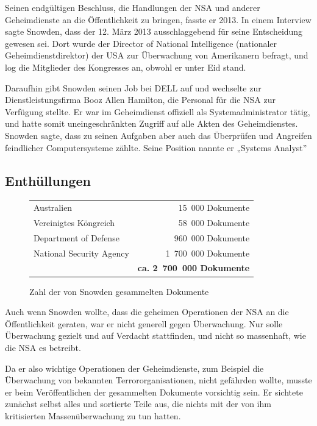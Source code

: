 \documentclass[12pt,a4paper]{scrartcl}
\begin{document}
Seinen endgültigen Beschluss, die Handlungen der NSA und anderer Geheimdienste an die Öffentlichkeit zu bringen, fasste er 2013. In einem Interview sagte Snowden, dass der 12. März 2013 ausschlaggebend für seine Entscheidung gewesen sei. Dort wurde der Director of National Intelligence (nationaler Geheimdienstdirektor) der USA zur Überwachung von Amerikanern befragt, und log die Mitglieder des Kongresses an, obwohl er unter Eid stand.\cite{wiki_snowden}\cite{citizenfour}

Daraufhin gibt Snowden seinen Job bei DELL auf und wechselte zur Dienstleistungsfirma Booz Allen Hamilton, die Personal für die NSA zur Verfügung stellte. Er war im Geheimdienst offiziell als Systemadministrator tätig, und hatte somit uneingeschränkten Zugriff auf alle Akten des Geheimdienstes. Snowden sagte, dass zu seinen Aufgaben aber auch das Überprüfen und Angreifen feindlicher Computersysteme zählte. Seine Position nannte er „Systems Analyst”\cite{citizenfour}

\subsection{Enthüllungen}

\begin{figure}[H]
\centering
\begin{tabular}{lr}
Australien & 15~000 Dokumente \\
Vereinigtes Köngreich & 58~000 Dokumente \\
Department of Defense & 960~000 Dokumente \\
National Security Agency & 1~700~000 Dokumente \\
& \textbf{ca. 2~700~000 Dokumente}
\end{tabular}
\caption{Zahl der von Snowden gesammelten Dokumente \cite{wiki_snowden}}
\end{figure}

Auch wenn Snowden wollte, dass die geheimen Operationen der NSA an die Öffentlichkeit geraten, war er nicht generell gegen Überwachung. Nur solle Überwachung gezielt und auf Verdacht stattfinden, und nicht so massenhaft, wie die NSA es betreibt.\cite{wiki_snowden}\cite{citizenfour}

Da er also wichtige Operationen der Geheimdienste, zum Beispiel die Überwachung von bekannten Terrororganisationen, nicht gefährden wollte, musste er beim Veröffentlichen der gesammelten Dokumente vorsichtig sein. Er sichtete zunächst selbst alles und sortierte Teile aus, die nichts mit der von ihm kritisierten Massenüberwachung zu tun hatten.\cite{wiki_snowden}\cite{citizenfour}
\end{document}

